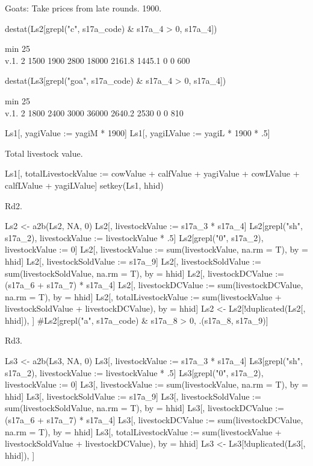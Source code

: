 Goats: Take prices from late rounds. 1900.
\begin{Schunk}
\begin{Sinput}
destat(Ls2[grepl("c", s17a_code) & s17a_4 > 0, s17a_4])
\end{Sinput}
\begin{Soutput}
     min 25\\% median 75\\%   max   mean    std 0s NAs   n
v.1.   2  1500   1900  2800 18000 2161.8 1445.1  0   0 600
\end{Soutput}
\begin{Sinput}
destat(Ls3[grepl("goa", s17a_code) & s17a_4 > 0, s17a_4])
\end{Sinput}
\begin{Soutput}
     min 25\\% median 75\\%   max   mean  std 0s NAs   n
v.1.   2  1800   2400  3000 36000 2640.2 2530  0   0 810
\end{Soutput}
\begin{Sinput}
Ls1[, yagiValue := yagiM * 1900]
Ls1[, yagiLValue := yagiL * 1900 * .5]
\end{Sinput}
\end{Schunk}
Total livestock value.
\begin{Schunk}
\begin{Sinput}
Ls1[, totalLivestockValue := cowValue + calfValue + yagiValue + 
	cowLValue + calfLValue + yagiLValue]
setkey(Ls1, hhid)
\end{Sinput}
\end{Schunk}
Rd2.
\begin{Schunk}
\begin{Sinput}
Ls2 <- a2b(Ls2, NA, 0)
Ls2[, livestockValue := s17a_3 * s17a_4]
Ls2[grepl("sh", s17a_2), livestockValue := livestockValue * .5]
Ls2[grepl("0", s17a_2), livestockValue := 0]
Ls2[, livestockValue := sum(livestockValue, na.rm = T), by = hhid]
Ls2[, livestockSoldValue := s17a_9]
Ls2[, livestockSoldValue := sum(livestockSoldValue, na.rm = T), 
	by = hhid]
Ls2[, livestockDCValue := (s17a_6 + s17a_7) * s17a_4]
Ls2[, livestockDCValue := sum(livestockDCValue, na.rm = T), 
	by = hhid]
Ls2[, totalLivestockValue := sum(livestockValue + livestockSoldValue + livestockDCValue), by = hhid]
Ls2 <- Ls2[!duplicated(Ls2[, hhid]), ]
#Ls2[grepl("a", s17a_code) & s17a_8 > 0, .(s17a_8, s17a_9)]
\end{Sinput}
\end{Schunk}
Rd3.
\begin{Schunk}
\begin{Sinput}
Ls3 <- a2b(Ls3, NA, 0)
Ls3[, livestockValue := s17a_3 * s17a_4]
Ls3[grepl("sh", s17a_2), livestockValue := livestockValue * .5]
Ls3[grepl("0", s17a_2), livestockValue := 0]
Ls3[, livestockValue := sum(livestockValue, na.rm = T), by = hhid]
Ls3[, livestockSoldValue := s17a_9]
Ls3[, livestockSoldValue := sum(livestockSoldValue, na.rm = T), 
	by = hhid]
Ls3[, livestockDCValue := (s17a_6 + s17a_7) * s17a_4]
Ls3[, livestockDCValue := sum(livestockDCValue, na.rm = T), 
	by = hhid]
Ls3[, totalLivestockValue := sum(livestockValue + livestockSoldValue + livestockDCValue), by = hhid]
Ls3 <- Ls3[!duplicated(Ls3[, hhid]), ]
\end{Sinput}
\end{Schunk}
